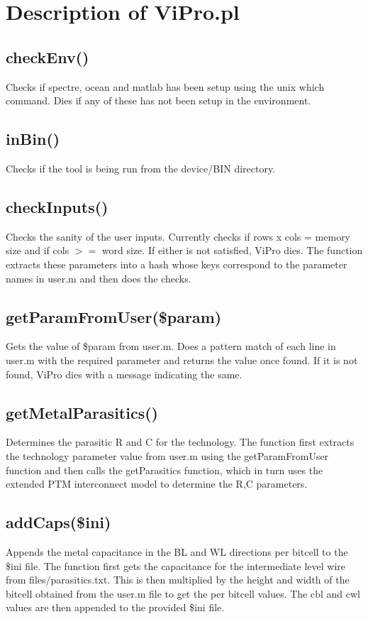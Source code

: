 \section{Description of ViPro.pl}
\label{functions}

\subsection{ checkEnv()}
Checks if spectre, ocean and matlab has been setup using the unix which command. Dies if any of these has not been setup in the environment.

\subsection{ inBin()}
Checks if the tool is being run from the device/BIN directory.

\subsection{ checkInputs()}
Checks the sanity of the user inputs. Currently checks if rows x cols = memory size and if cols $>=$ word size. If either is not satisfied, ViPro dies. The function extracts these parameters into a hash whose keys correspond to the parameter names in user.m and then does the checks.

\subsection{ getParamFromUser(\$param)}
Gets the value of \$param from user.m. Does a pattern match of each line in user.m with the required parameter and returns the value once found. If it is not found, ViPro dies with a message indicating the same.

\subsection{ getMetalParasitics()}
Determines the parasitic R and C for the technology. The function first extracts the technology parameter value from user.m using the getParamFromUser function and then calls the getParasitics function, which in turn uses the extended PTM interconnect model to determine the R,C parameters.

\subsection{ addCaps(\$ini)}
Appends the metal capacitance in the BL and WL directions per bitcell to the \$ini file. The function first gets the capacitance for the intermediate level wire from files/parasitics.txt. This is then multiplied by the height and width of the bitcell obtained from the user.m file to get the per bitcell values. The cbl and cwl values are then appended to the provided \$ini file.

